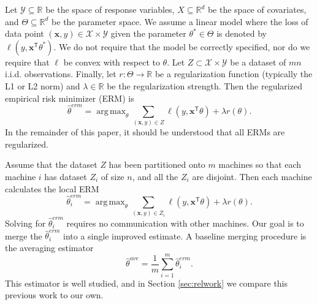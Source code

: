 \documentclass[twoside]{article}
\DeclareMathOperator*{\argmax}{arg\,max}
\newcommand{\Y}{\mathcal{Y}}
\newcommand{\X}{\mathcal{X}}
\newcommand{\E}{\mathbb{E}}
\newcommand{\x}{\mathbf{x}}
\newcommand{\w}{\theta}
\newcommand{\wave}{\hat\w^{ave}}
\newcommand{\wmle}{\hat\w^{erm}}
\newcommand{\wstar}{{\w^{*}}}
\newcommand{\reg}{r}
\newcommand{\loss}{\ell}
\newcommand{\trans}[1]{\ensuremath{{#1}^{\mathsf{T}}}}
\newcommand{\ltwo}[1]{{\lVert {#1} \rVert}}
\begin{document}
Let $\Y\subseteq\mathbb{R}$ be the space of response variables,
$X\subseteq\mathbb{R}^d$ be the space of covariates,
and $\Theta\subseteq\mathbb{R}^d$ be the parameter space.
We assume a linear model where the loss of data point $(\x,y)\in\X\times\Y$ given the parameter $\wstar\in\Theta$ is denoted by $\loss(y,\trans\x\wstar)$.
We do not require that the model be correctly specified,
nor do we require that $\loss$ be convex with respect to $\w$.
Let $Z\subset\X\times\Y$ be a dataset of $mn$ i.i.d. observations.
Finally, let $\reg : \Theta \to \mathbb{R}$ be a regularization function (typically the L1 or L2 norm)
and $\lambda\in\mathbb{R}$ be the regularization strength.
Then the regularized empirical risk minimizer (ERM) is
\begin{equation}
\wmle=\argmax_\w \sum_{(\x,y)\in Z} \loss(y,\trans\x\w)
+ \lambda \reg(\theta)
.
\end{equation}
In the remainder of this paper, it should be understood that all ERMs are regularized.

Assume that the dataset $Z$ has been partitioned onto $m$ machines so that each machine $i$ has dataset $Z_i$ of size $n$, and all the $Z_i$ are disjoint.
Then each machine calculates the local ERM
\begin{equation}
\wmle_i = \argmax_\w \sum_{(\x,y) \in Z_i} \loss(y,\trans\x\w)
+ \lambda \reg(\theta)
.
\end{equation}
Solving for $\wmle_i$ requires no communication with other machines.
Our goal is to merge the $\wmle_i$ into a single improved estimate.
A baseline merging procedure is the averaging estimator
\begin{equation}
\wave = \frac{1}{m}\sum_{i=1}^m \wmle_i
.
\end{equation}
This estimator is well studied, and in Section \ref{sec:relwork} we compare this previous work to our own.
\end{document}
